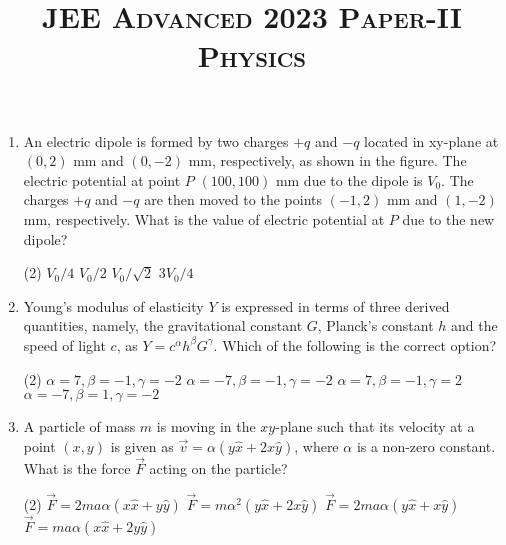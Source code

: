\documentclass{article}
\title{\textsc{JEE Advanced 2023 Paper-II\\Physics}}
\date{}
\begin{document}
\maketitle

\begin{enumerate}
    \item An electric dipole is formed by two charges \(+q\) and \(-q\) located in xy-plane at \((0,2)\) mm and \((0,-2)\) mm, respectively, as shown in the figure. The electric potential at point \(P\) \((100,100)\) mm due to the dipole is \(V_0\). The charges \(+q\) and \(-q\) are then moved to the points \((-1,2)\) mm and \((1,-2)\) mm, respectively. What is the value of electric potential at \(P\) due to the new dipole?
        \begin{tasks}(2)
        	\task \(V_0/4\)
        	\task \(V_0/2\)
        	\task \(V_0/\sqrt{2}\)
        	\task \(3V_0/4\)
        \end{tasks}
    \item Young's modulus of elasticity \(Y\) is expressed in terms of three derived quantities, namely, the gravitational constant \(G\), Planck's constant \(h\) and the speed of light \(c\), as \(Y = c^\alpha h^\beta G^\gamma\). Which of the following is the correct option?
        \begin{tasks}(2)
        	\task \(\alpha = 7, \beta = -1, \gamma = -2\)
        	\task \(\alpha = -7, \beta = -1, \gamma = -2\)
        	\task \(\alpha = 7, \beta = -1, \gamma = 2\)
        	\task \(\alpha = -7, \beta = 1, \gamma = -2\)
        \end{tasks}
    \item A particle of mass \(m\) is moving in the \(xy\)-plane such that its velocity at a point \((x,y)\) is given as \(\vec{v} = \alpha(y\hat{x} + 2x\hat{y})\), where \(\alpha\) is a non-zero constant. What is the force \( \vec{F} \) acting on the particle?
        \begin{tasks}(2)
        	\task \(\vec{F} = 2ma\alpha(x\hat{x} + y\hat{y})\)
        	\task \(\vec{F} = m\alpha^2(y\hat{x} + 2x\hat{y})\)
        	\task \(\vec{F} = 2ma\alpha(y\hat{x} + x\hat{y})\)
        	\task \(\vec{F} = ma\alpha(x\hat{x} + 2y\hat{y})\)
        \end{tasks}
    \begin{center}
    \end{center}
    


\end{enumerate}
\end{document}
